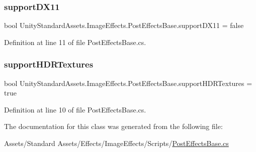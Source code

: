 \subsubsection{\texorpdfstring{support\+D\+X11}{supportDX11}}
{\footnotesize\ttfamily bool Unity\+Standard\+Assets.\+Image\+Effects.\+Post\+Effects\+Base.\+support\+D\+X11 = false\hspace{0.3cm}{\ttfamily [protected]}}



Definition at line 11 of file Post\+Effects\+Base.\+cs.

\mbox{\label{class_unity_standard_assets_1_1_image_effects_1_1_post_effects_base_afe07c7112eeb27534eabb78239ef7613}} 
\subsubsection{\texorpdfstring{support\+H\+D\+R\+Textures}{supportHDRTextures}}
{\footnotesize\ttfamily bool Unity\+Standard\+Assets.\+Image\+Effects.\+Post\+Effects\+Base.\+support\+H\+D\+R\+Textures = true\hspace{0.3cm}{\ttfamily [protected]}}



Definition at line 10 of file Post\+Effects\+Base.\+cs.



The documentation for this class was generated from the following file\+:\begin{DoxyCompactItemize}
\item 
Assets/\+Standard Assets/\+Effects/\+Image\+Effects/\+Scripts/\mbox{\hyperlink{_post_effects_base_8cs}{Post\+Effects\+Base.\+cs}}\end{DoxyCompactItemize}
